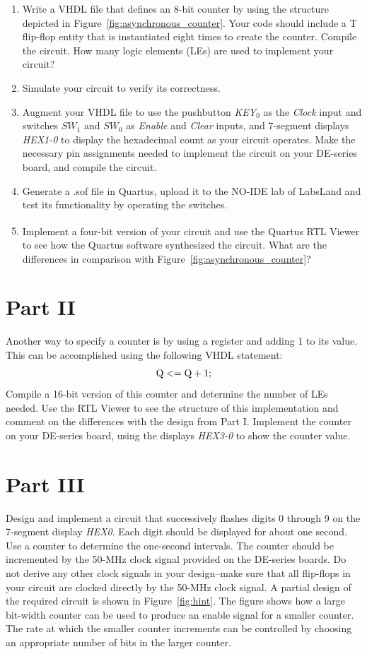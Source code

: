 \documentclass[epsfig,10pt,fullpage]{article}
\begin{document}
\begin{enumerate}
\item Write a VHDL file that defines an 8-bit counter by using the structure
depicted in Figure~\ref{fig:asynchronous_counter}. Your code should include a T 
flip-flop entity that is instantiated
eight times to create the counter. Compile the circuit. How many logic elements (LEs) are 
used to implement your circuit? 
\item Simulate your circuit to verify its correctness.
\item Augment your VHDL file to use the pushbutton {\it KEY}$_0$ as the {\it Clock}
input and switches $SW_1$ and $SW_0$ as {\it Enable} and {\it Clear} inputs, and
7-segment displays {\it HEX1-0} to display the hexadecimal count as your circuit
operates. Make the necessary pin assignments needed to implement the circuit on your
DE-series board, and compile the circuit.
\item Generate a .sof file in Quartus, upload it to the NO-IDE lab of LabsLand and test its functionality by operating
the switches.
\item Implement a four-bit version of your circuit and use the Quartus\textsuperscript{\textregistered} RTL Viewer to
see how the Quartus software synthesized the circuit. What are the differences in
comparison with Figure~\ref{fig:asynchronous_counter}?
\end{enumerate}

\section*{Part II}
Another way to specify a counter is by using a register and adding 1 to its value. 
This can be accomplished using the following VHDL statement:
$$
{\rm Q <= Q + 1;}
$$
\noindent
Compile a 16-bit version of this counter and determine the number of LEs needed.  Use the RTL 
Viewer to see the structure of this implementation and comment on the differences with the 
design from Part I. Implement the counter on your DE-series board, using the displays 
{\it HEX3-0} to show the counter value.

\section*{Part III}
Design and implement a circuit that successively flashes digits 0 
through 9 on the 7-segment display {\it HEX0}. Each digit should be 
displayed for about one second. Use a counter to determine the one-second 
intervals. The counter should be incremented by the 50-MHz clock signal 
provided on the DE-series boards. Do not derive any other clock signals in your design--make 
sure that all flip-flops in your circuit are clocked directly by the 50-MHz clock signal.
A partial design of the required circuit is shown in Figure~\ref{fig:hint}. The figure
shows how a large bit-width counter can be used to produce an enable signal for a smaller
counter. The rate at which the smaller counter increments can be controlled by choosing an
appropriate number of bits in the larger counter.
\end{document}

